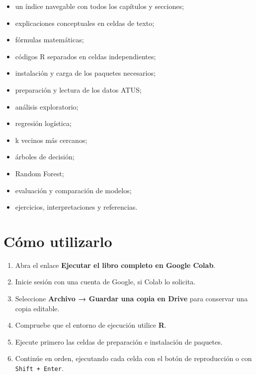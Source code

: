 \documentclass[
  spanish,
  10.5pt,
  letterpaper,
  openany,
  headings=big]{scrbook}
\providecommand{\tightlist}{%
  \setlength{\itemsep}{0pt}\setlength{\parskip}{0pt}}
\begin{document}
\begin{itemize}
\tightlist
\item
  un índice navegable con todos los capítulos y secciones;
\item
  explicaciones conceptuales en celdas de texto;
\item
  fórmulas matemáticas;
\item
  códigos R separados en celdas independientes;
\item
  instalación y carga de los paquetes necesarios;
\item
  preparación y lectura de los datos ATUS;
\item
  análisis exploratorio;
\item
  regresión logística;
\item
  k vecinos más cercanos;
\item
  árboles de decisión;
\item
  Random Forest;
\item
  evaluación y comparación de modelos;
\item
  ejercicios, interpretaciones y referencias.
\end{itemize}

\section*{Cómo utilizarlo}\label{cuxf3mo-utilizarlo}


\begin{enumerate}
\def\labelenumi{\arabic{enumi}.}
\tightlist
\item
  Abra el enlace \textbf{Ejecutar el libro completo en Google Colab}.
\item
  Inicie sesión con una cuenta de Google, si Colab lo solicita.
\item
  Seleccione \textbf{Archivo → Guardar una copia en Drive} para
  conservar una copia editable.
\item
  Compruebe que el entorno de ejecución utilice \textbf{R}.
\item
  Ejecute primero las celdas de preparación e instalación de paquetes.
\item
  Continúe en orden, ejecutando cada celda con el botón de reproducción
  o con \texttt{Shift\ +\ Enter}.
\end{enumerate}
\end{document}
